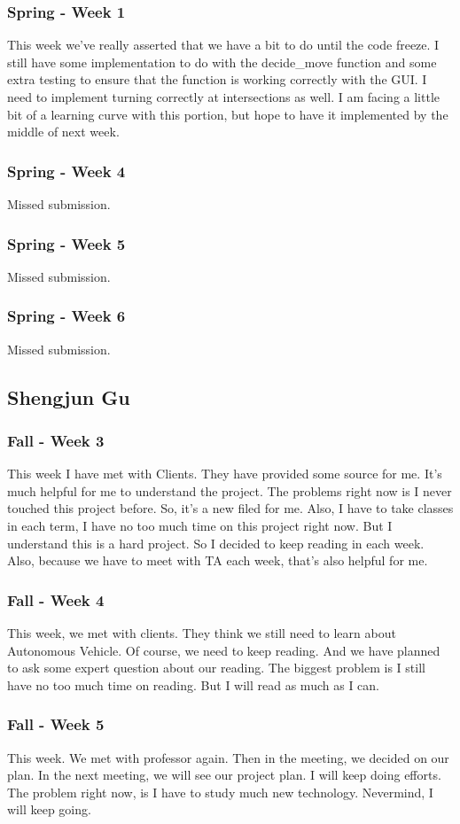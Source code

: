 \documentclass[onecolumn, draftclsnofoot,10pt, compsoc]{IEEEtran}
\begin{document}
\subsubsection{Spring - Week 1}
This week we’ve really asserted that we have a bit to do until the code freeze.
I still have some implementation to do with the decide\_move function and some extra testing to ensure that the function is working correctly with the GUI.
I need to implement turning correctly at intersections as well.
I am facing a little bit of a learning curve with this portion, but hope to have it implemented by the middle of next week.
\subsubsection{Spring - Week 4}
Missed submission.
\subsubsection{Spring - Week 5}
Missed submission.
\subsubsection{Spring - Week 6}
Missed submission.
\subsection{Shengjun Gu}
\subsubsection{Fall - Week 3}
This week I have met with Clients.
They have provided some source for me.
It's much helpful for me to understand the project.
The problems right now is I never touched this project before.
So, it's a new filed for me.
Also, I have to take classes in each term, I have no too much time on this project right now.
But I understand this is a hard project.
So I decided to keep reading in each week.
Also, because we have to meet with TA each week, that's also helpful for me.
\subsubsection{Fall - Week 4}
This week, we met with clients.
They think we still need to learn about Autonomous Vehicle.
Of course, we need to keep reading.
And we have planned to ask some expert question about our reading.
The biggest problem is I still have no too much time on reading.
But I will read as much as I can.
\subsubsection{Fall - Week 5}
This week.
We met with professor again.
Then in the meeting, we decided on our plan.
In the next meeting, we will see our project plan.
I will keep doing efforts.
The problem right now, is I have to study much new technology.
Nevermind, I will keep going.
\end{document}
